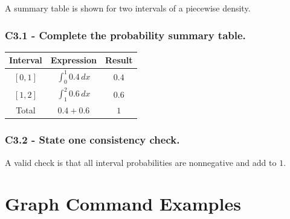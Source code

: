 	A summary table is shown for two intervals of a piecewise density.
	
	
	\subsubsection*{C3.1 - Complete the probability summary table.}
	\label{subsec:example-table-and-probability-summary-c3-a}
	
	\begin{minipage}[t]{0.54\textwidth}
		\vspace{0pt}
		\centering
		
		\begin{tabular}{|c|c|c|}
			\hline
			Interval & Expression & Result \\
			\hline
			$[0,1]$ & $\int_0^1 0.4\,dx$ & $0.4$ \\
			$[1,2]$ & $\int_1^2 0.6\,dx$ & $0.6$ \\
			\hline
			Total & $0.4+0.6$ & $1$ \\
			\hline
		\end{tabular}
	\end{minipage}
	\hfill
	\begin{minipage}[t]{0.42\textwidth}
		\vspace{0pt}
		\centering
		
	\end{minipage}
	
	
	\subsubsection*{C3.2 - State one consistency check.}
	\label{subsec:example-table-and-probability-summary-c3-b}
	
	A valid check is that all interval probabilities are nonnegative and add to $1$.
	
	
	\section{Graph Command Examples}
	\label{sec:graph-command-examples}
	
